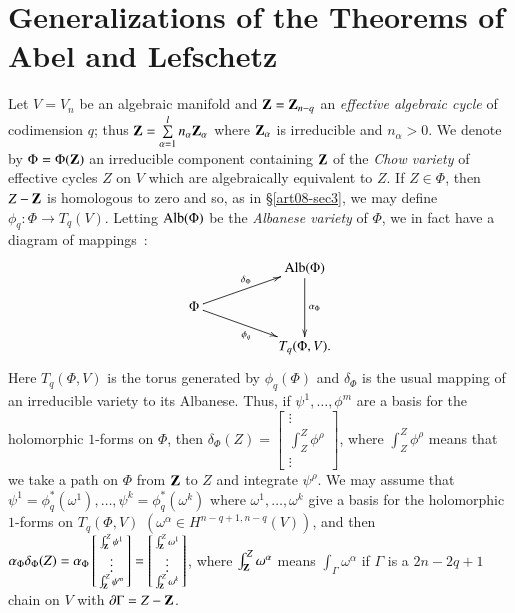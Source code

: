 \section{Generalizations of the Theorems of Abel and Lefschetz}\label{art08-sec5}

Let $V=V_{n}$ be an algebraic manifold and $\mathbf{Z}=\mathbf{Z}_{n-q}$ an {\em effective algebraic cycle} of codimension $q$; thus $\mathbf{Z}=\sum\limits^{l}_{\alpha=1}n_{\alpha}\mathbf{Z}_{\alpha}$ where $\mathbf{Z}_{\alpha}$ is irreducible and $n_{\alpha}>0$. We denote by $\Phi=\Phi (\mathbf{Z})$ an irreducible component containing $\mathbf{Z}$ of the {\em Chow variety} \cite{art08-key13} of effective cycles $Z$ on $V$ which are algebraically equivalent to $Z$. If $Z\in \Phi$, then $Z-\mathbf{Z}$ is homologous to zero and so, as in \S\ref{art08-sec3}, we may define $\phi_{q}:\Phi\to T_{q}(V)$. Letting $\operatorname{\mathrm{Alb}}(\Phi)$ be the {\em Albanese variety} of $\Phi$, we in fact have a diagram of mappings~:
\setcounter{equation}{0}
\begin{equation}
\vcenter{
\xymatrix@C=1.8cm@R=.5cm{
 & \Alb(\Phi)\ar[dd]^-{\alpha_{\Phi}}\\
\Phi\ar[ur]^{\delta_{\Phi}}\ar[dr]_{\phi_{q}} &\\
 & T_{q}(\Phi,V).
}}\label{art08-sec5-eq5.1}
\end{equation}
Here $T_{q}(\Phi,V)$ is the torus generated by $\phi_{q}(\Phi)$ and $\delta_{\Phi}$ is the usual mapping of an irreducible variety to its Albanese. Thus, if $\psi^{1},\ldots,\phi^{m}$ are a basis for the holomorphic $1$-forms on $\Phi$, then $\delta_{\Phi}(Z)=\left[\begin{smallmatrix}\vdots\\\int^{Z}_{Z}\phi^{\rho}\\\vdots\end{smallmatrix}\right]$, where $\int^{Z}_{Z}\phi^{\rho}$ means that we take a path on $\Phi$ from $\mathbf{Z}$ to $Z$ and integrate $\psi^{\rho}$. We may assume that $\psi^{1}=\phi^{*}_{q}(\omega^{1}),\ldots,\psi^{k}=\phi^{*}_{q}(\omega^{k})$ where $\omega^{1},\ldots,\omega^{k}$ give a basis for the holomorphic $1$-forms on $T_{q}(\Phi,V)$ $(\omega^{\alpha}\in H^{n-q+1,n-q}(V))$, and then $\alpha_{\Phi}\delta_{\Phi}(Z)=\alpha_{\Phi}\left[\begin{smallmatrix}\int^{Z}_{\mathbf{Z}}\psi^{1}\\\vdots\\\int^{Z}_{\mathbf{Z}}\psi^{m}\end{smallmatrix}\right]=\left[\begin{smallmatrix}\int^{Z}_{\mathbf{Z}}\omega^{1}\\\vdots\\\int^{Z}_{\mathbf{Z}}\omega^{k}\end{smallmatrix}\right]$, where $\int^{Z}_{\mathbf{Z}}\omega^{\alpha}$ means $\int_{\Gamma}\omega^{\alpha}$ if $\Gamma$ is a $2n-2q+1$ chain on $V$ with $\partial \Gamma=Z-\mathbf{Z}$.

